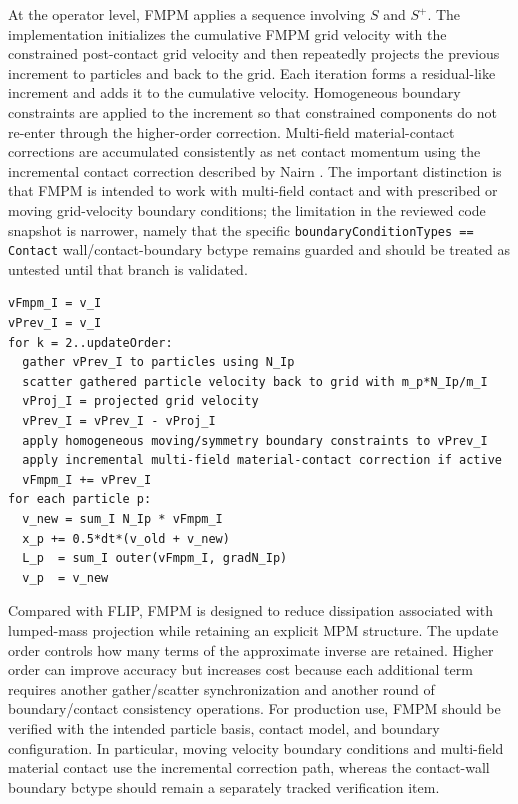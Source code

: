 At the operator level, FMPM applies a sequence involving $S$ and $S^+$.  The implementation initializes the cumulative FMPM grid velocity with the constrained post-contact grid velocity and then repeatedly projects the previous increment to particles and back to the grid.  Each iteration forms a residual-like increment and adds it to the cumulative velocity.  Homogeneous boundary constraints are applied to the increment so that constrained components do not re-enter through the higher-order correction.  Multi-field material-contact corrections are accumulated consistently as net contact momentum using the incremental contact correction described by Nairn \cite{nairn2026fmpm}.  The important distinction is that FMPM is intended to work with multi-field contact and with prescribed or moving grid-velocity boundary conditions; the limitation in the reviewed code snapshot is narrower, namely that the specific \texttt{boundaryConditionTypes == Contact} wall/contact-boundary bctype remains guarded and should be treated as untested until that branch is validated.

\begin{lstlisting}[caption={FMPM approximate full-mass update.},basicstyle=\ttfamily\small]
vFmpm_I = v_I
vPrev_I = v_I
for k = 2..updateOrder:
  gather vPrev_I to particles using N_Ip
  scatter gathered particle velocity back to grid with m_p*N_Ip/m_I
  vProj_I = projected grid velocity
  vPrev_I = vPrev_I - vProj_I
  apply homogeneous moving/symmetry boundary constraints to vPrev_I
  apply incremental multi-field material-contact correction if active
  vFmpm_I += vPrev_I
for each particle p:
  v_new = sum_I N_Ip * vFmpm_I
  x_p += 0.5*dt*(v_old + v_new)
  L_p  = sum_I outer(vFmpm_I, gradN_Ip)
  v_p  = v_new
\end{lstlisting}

Compared with FLIP, FMPM is designed to reduce dissipation associated with lumped-mass projection while retaining an explicit MPM structure.  The update order controls how many terms of the approximate inverse are retained.  Higher order can improve accuracy but increases cost because each additional term requires another gather/scatter synchronization and another round of boundary/contact consistency operations.  For production use, FMPM should be verified with the intended particle basis, contact model, and boundary configuration.  In particular, moving velocity boundary conditions and multi-field material contact use the incremental correction path, whereas the contact-wall boundary bctype should remain a separately tracked verification item.

